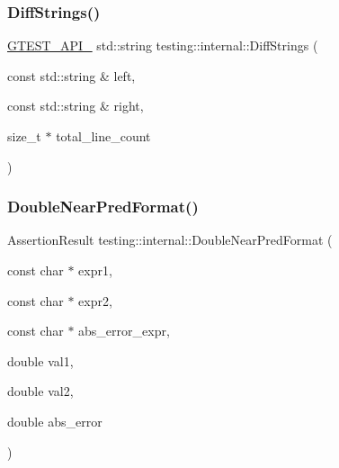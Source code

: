 \mbox{\label{namespacetesting_1_1internal_a513107ff8defa97d949937fc1350a56c}} 
\subsubsection{\texorpdfstring{DiffStrings()}{DiffStrings()}}
{\footnotesize\ttfamily \mbox{\hyperlink{_obj__test_2lib_2googletest-release-1_88_81_2googletest_2include_2gtest_2internal_2gtest-port_8h_aa73be6f0ba4a7456180a94904ce17790}{G\+T\+E\+S\+T\+\_\+\+A\+P\+I\+\_\+}} std\+::string testing\+::internal\+::\+Diff\+Strings (\begin{DoxyParamCaption}\item[{const std\+::string \&}]{left,  }\item[{const std\+::string \&}]{right,  }\item[{size\+\_\+t $\ast$}]{total\+\_\+line\+\_\+count }\end{DoxyParamCaption})}

\mbox{\label{namespacetesting_1_1internal_a4f70b36c624b54c2362aeecc2f05ee8c}} 
\subsubsection{\texorpdfstring{DoubleNearPredFormat()}{DoubleNearPredFormat()}}
{\footnotesize\ttfamily Assertion\+Result testing\+::internal\+::\+Double\+Near\+Pred\+Format (\begin{DoxyParamCaption}\item[{const char $\ast$}]{expr1,  }\item[{const char $\ast$}]{expr2,  }\item[{const char $\ast$}]{abs\+\_\+error\+\_\+expr,  }\item[{double}]{val1,  }\item[{double}]{val2,  }\item[{double}]{abs\+\_\+error }\end{DoxyParamCaption})}

\mbox{\label{namespacetesting_1_1internal_a1a1a1aed3fe00908b8a45d5ab4a33665}} 

